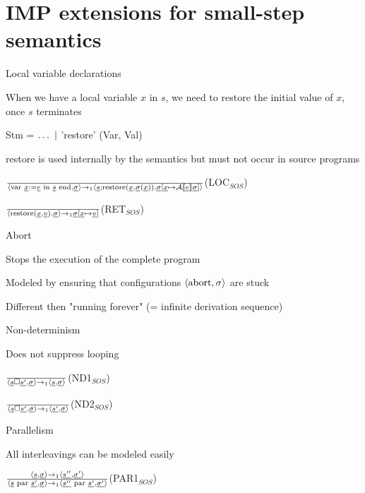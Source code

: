\section{IMP extensions for small-step semantics}
\enumstart
	\item Local variable declarations
	\enumstart
		\item When we have a local variable $x$ in $s$, we need to restore the initial value of $x$, once $s$ terminates
		\item Stm = $\mathellipsis \ |$ 'restore' (Var, Val)
		\item restore is used internally by the semantics but must not occur in source programs
		\item $\frac{}{\langle \text{var }\underline{x} := \underline{e}\text{ in }\underline{s}\text{ end}, \underline{\sigma} \rangle \rightarrow_1 \langle \underline{s}; \text{restore}(\underline{x}, \underline{\sigma}(\underline{x})), \underline{\sigma}[\underline{x} \mapsto \mathcal{A}\llbracket \underline{e} \rrbracket \underline{\sigma}] \rangle}$(LOC$_{SOS}$)
		\item $\frac{}{\langle\text{restore}(\underline{x},\underline{v}), \underline{\sigma}\rangle \rightarrow_1 \underline{\sigma}[\underline{x} \mapsto \underline{v}]}$(RET$_{SOS}$)
	\enumend
	\item Abort
	\enumstart
		\item Stops the execution of the complete program
		\item Modeled by ensuring that configurations $\langle \text{abort}, \sigma\rangle$ are stuck
		\item Different then "running forever" (= infinite derivation sequence)
	\enumend
	\item Non-determinism
	\enumstart
		\item Does not suppress looping
		\item $\frac{}{\langle\underline{s}\square \underline{s'}, \underline{\sigma} \rangle \rightarrow_1 \langle \underline{s}, \underline{\sigma} \rangle}$(ND1$_{SOS}$)
		\item $\frac{}{\langle \underline{s} \square \underline{s'}, \underline{\sigma} \rangle \rightarrow_1 \langle \underline{s'}, \underline{\sigma} \rangle}$(ND2$_{SOS}$)
	\enumend
	\item Parallelism
	\enumstart
		\item All interleavings can be modeled easily
		\item $\frac{\langle \underline{s}, \underline{\sigma} \rangle \rightarrow_1 \langle \underline{s''}, \underline{\sigma'} \rangle}{\langle \underline{s} \text{ par }\underline{s'}, \underline{\sigma} \rangle \rightarrow_1 \langle \underline{s''} \text{ par }\underline{s'}, \underline{\sigma'} \rangle}$(PAR1$_{SOS}$)
